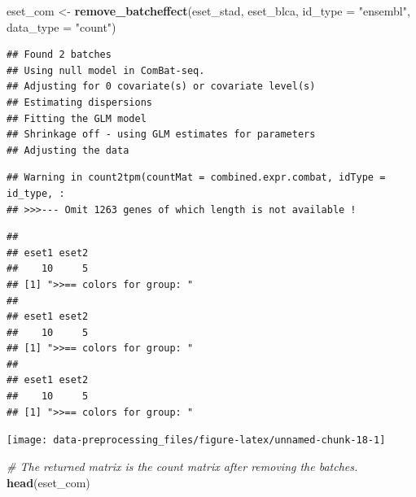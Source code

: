 \documentclass[
  12pt,
]{book}
\newenvironment{Shaded}{\begin{snugshade}}{\end{snugshade}}
\newcommand{\AttributeTok}[1]{\textcolor[rgb]{0.13,0.29,0.53}{#1}}
\newcommand{\CommentTok}[1]{\textcolor[rgb]{0.56,0.35,0.01}{\textit{#1}}}
\newcommand{\FunctionTok}[1]{\textcolor[rgb]{0.13,0.29,0.53}{\textbf{#1}}}
\newcommand{\NormalTok}[1]{#1}
\newcommand{\OtherTok}[1]{\textcolor[rgb]{0.56,0.35,0.01}{#1}}
\newcommand{\StringTok}[1]{\textcolor[rgb]{0.31,0.60,0.02}{#1}}
\begin{document}
\begin{Shaded}
\begin{Highlighting}[]
\NormalTok{eset\_com }\OtherTok{\textless{}{-}} \FunctionTok{remove\_batcheffect}\NormalTok{(eset\_stad, eset\_blca, }\AttributeTok{id\_type =} \StringTok{"ensembl"}\NormalTok{, }\AttributeTok{data\_type =} \StringTok{"count"}\NormalTok{)}
\end{Highlighting}
\end{Shaded}

\begin{verbatim}
## Found 2 batches
## Using null model in ComBat-seq.
## Adjusting for 0 covariate(s) or covariate level(s)
## Estimating dispersions
## Fitting the GLM model
## Shrinkage off - using GLM estimates for parameters
## Adjusting the data
\end{verbatim}

\begin{verbatim}
## Warning in count2tpm(countMat = combined.expr.combat, idType = id_type, :
## >>>--- Omit 1263 genes of which length is not available !
\end{verbatim}

\begin{verbatim}
## 
## eset1 eset2 
##    10     5 
## [1] ">>== colors for group: "
## 
## eset1 eset2 
##    10     5 
## [1] ">>== colors for group: "
## 
## eset1 eset2 
##    10     5 
## [1] ">>== colors for group: "
\end{verbatim}

\begin{center}\texttt{[image: data-preprocessing\_files/figure-latex/unnamed-chunk-18-1]} \end{center}

\begin{Shaded}
\begin{Highlighting}[]
\CommentTok{\# The returned matrix is the count matrix after removing the batches.}
\FunctionTok{head}\NormalTok{(eset\_com)}
\end{Highlighting}
\end{Shaded}
\end{document}

